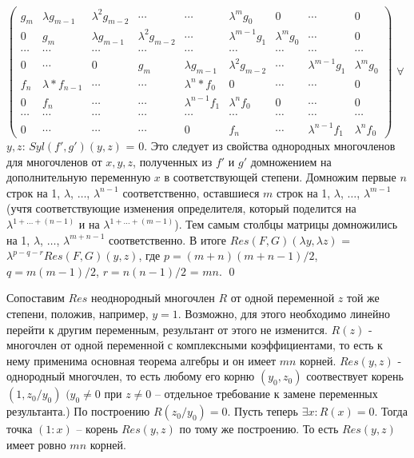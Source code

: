 \documentclass[a4paper, 12pt]{article}
\begin{document}
$\begin{pmatrix}
g_m & \lambda g_{m-1} & \lambda^{2} g_{m-2} & \cdots & \cdots & \lambda^{m}g_0 & 0 & \cdots & 0 \\
0 & g_m & \lambda g_{m-1} & \lambda^{2} g_{m-2} & \cdots & \lambda^{m-1} g_1 & \lambda^{m} g_0 & \cdots & 0 \\
\cdots & \cdots & \cdots & \cdots & \cdots & \cdots & \cdots & \cdots & \cdots \\
0 & \cdots & 0 & g_m & \lambda g_{m-1} & \lambda^{2} g_{m-2} & \cdots & \lambda^{m-1} g_1 & \lambda^{m} g_0 \\
f_n & \lambda*f_{n-1} & \cdots & \cdots & \lambda^{n}*f_0 & 0 & \cdots & \cdots & 0 \\
0 & f_n & \cdots & \cdots & \lambda^{n-1} f_1 & \lambda^{n} f_0 & 0 & \cdots & 0 \\
\cdots & \cdots & \cdots & \cdots & \cdots & \cdots & \cdots & \cdots & \cdots \\
0 & \cdots & \cdots & \cdots & 0 & f_n & \cdots & \lambda^{n-1} f_1 & \lambda^{n} f_0
\end{pmatrix}$\newline
$\forall$ $y,z$: $Syl(f',g')(y,z)$ = $0$. Это следует из свойства однородных многочленов для многочленов от $x,y,z$, полученных из $f'$ и $g'$ домножением на дополнительную переменную $x$ в соответствующей степени.
\smallskip
Домножим первые $n$ строк на 1, $\lambda$, $\dots$, $\lambda^{n-1}$ соответственно, оставшиеся $m$ строк на 1, $\lambda$, $\dots$, $\lambda^{m-1}$ (учтя соответствующие изменения определителя, который поделится на $\lambda^{1 +\dots + (n-1)}$ и на $\lambda^{1 +\dots + (m-1)}$).
Тем самым столбцы матрицы домножились на 1, $\lambda$, $\dots$, $\lambda^{m + n - 1}$ соответственно.\newline
В итоге $Res(F,G)(\lambda y,\lambda z)$ = $\lambda^{p-q-r}Res(F,G)(y,z)$, где $p = (m+n)(m+n-1)/2$, $q = m(m-1)/2 $, $r = n(n-1)/2$ = $mn$.
\qed

\bigskip
Сопоставим $Res$ неоднородный многочлен $R$ от одной переменной $z$ той же степени, положив, например, $y=1$. Возможно, для этого необходимо линейно перейти к другим переменным, результант от этого не изменится.\newline
$R(z)$ - многочлен от одной переменной с комплексными коэффициентами, то есть к нему применима основная теорема алгебры и он имеет $mn$ корней.\newline
$Res(y,z)$ - однородный многочлен, то есть любому его корню $(y_0, z_0)$ соотвествует корень $(1, z_0/y_0)$ $(y_0 \neq 0$ при $z \neq 0$ -- отдельное требование к замене переменных результанта.)
По построению $R(z_0/y_0) = 0$.\newline
Пусть теперь $\exists x: R(x) = 0$. Тогда точка $(1:x)$ -- корень $Res(y,z)$ по тому же построению.
То есть $Res(y,z)$ имеет ровно $mn$ корней.
\end{document}
